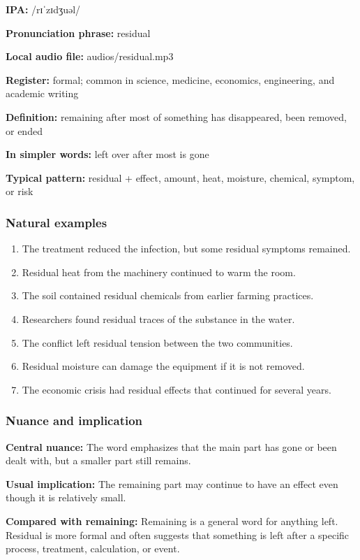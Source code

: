 \documentclass[11pt]{article}
\begin{document}
\textbf{IPA:} /rɪˈzɪdʒuəl/

\textbf{Pronunciation phrase:} residual

\textbf{Local audio file:} audios/residual.mp3

\textbf{Register:} formal; common in science, medicine, economics, engineering, and academic writing

\textbf{Definition:} remaining after most of something has disappeared, been removed, or ended

\textbf{In simpler words:} left over after most is gone

\textbf{Typical pattern:} residual + effect, amount, heat, moisture, chemical, symptom, or risk

\subsubsection{Natural examples}
\begin{enumerate}
  \item The treatment reduced the infection, but some residual symptoms remained.
  \item Residual heat from the machinery continued to warm the room.
  \item The soil contained residual chemicals from earlier farming practices.
  \item Researchers found residual traces of the substance in the water.
  \item The conflict left residual tension between the two communities.
  \item Residual moisture can damage the equipment if it is not removed.
  \item The economic crisis had residual effects that continued for several years.
\end{enumerate}

\subsubsection{Nuance and implication}
\textbf{Central nuance:} The word emphasizes that the main part has gone or been dealt with, but a smaller part still remains.

\textbf{Usual implication:} The remaining part may continue to have an effect even though it is relatively small.

\textbf{Compared with remaining:} Remaining is a general word for anything left. Residual is more formal and often suggests that something is left after a specific process, treatment, calculation, or event.
\end{document}
